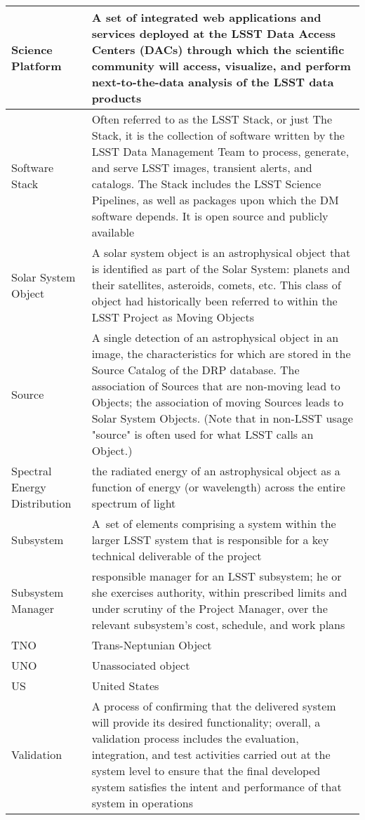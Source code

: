 \begin{longtable}{|p{}|p{}|}
Science Platform & A set of integrated web applications and services deployed at the \gls{LSST} Data Access Centers (DACs) through which the scientific community will access, visualize, and perform next-to-the-data analysis of the \gls{LSST} data products \\\hline
Software Stack & Often referred to as the \gls{LSST} Stack, or just The Stack, it is the collection of software written by the \gls{LSST} \gls{Data Management} Team to process, generate, and serve \gls{LSST} images, \gls{transient} alerts, and catalogs. The Stack includes the \gls{LSST} \gls{Science Pipelines}, as well as packages upon which the \gls{DM} software depends. It is open source and publicly available \\\hline
Solar System \gls{Object} & A solar system object is an astrophysical object that is identified as part of the Solar System: planets and their satellites, asteroids, comets, etc. This class of object had historically been referred to within the \gls{LSST} Project as Moving Objects \\\hline
Source & A single detection of an astrophysical object in an image, the characteristics for which are stored in the \gls{Source} Catalog of the \gls{DRP} database. The association of Sources that are non-moving lead to Objects; the association of moving Sources leads to Solar System Objects. (Note that in non-LSST usage "source" is often used for what \gls{LSST} calls an \gls{Object}.) \\\hline
Spectral Energy Distribution & the radiated energy of an astrophysical object as a function of energy (or wavelength) across the entire spectrum of light \\\hline
Subsystem & A set of elements comprising a system within the larger \gls{LSST} system that is responsible for a key technical deliverable of the project \\\hline
Subsystem Manager & responsible manager for an LSST subsystem; he or she exercises authority, within prescribed limits and under scrutiny of the Project Manager, over the relevant subsystem's cost, schedule, and work plans \\\hline
TNO & Trans-Neptunian \gls{Object} \\\hline
UNO & Unassociated object \\\hline
US & United States \\\hline
Validation & A process of confirming that the delivered system will provide its desired functionality; overall, a validation process includes the evaluation, integration, and test activities carried out at the system level to ensure that the final developed system satisfies the intent and performance of that system in operations \\\hline

\end{longtable}
